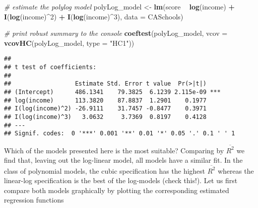 \documentclass[]{book}
\newenvironment{Shaded}{\begin{snugshade}}{\end{snugshade}}
\newcommand{\KeywordTok}[1]{\textcolor[rgb]{0.13,0.29,0.53}{\textbf{#1}}}
\newcommand{\DataTypeTok}[1]{\textcolor[rgb]{0.13,0.29,0.53}{#1}}
\newcommand{\DecValTok}[1]{\textcolor[rgb]{0.00,0.00,0.81}{#1}}
\newcommand{\StringTok}[1]{\textcolor[rgb]{0.31,0.60,0.02}{#1}}
\newcommand{\CommentTok}[1]{\textcolor[rgb]{0.56,0.35,0.01}{\textit{#1}}}
\newcommand{\OperatorTok}[1]{\textcolor[rgb]{0.81,0.36,0.00}{\textbf{#1}}}
\newcommand{\NormalTok}[1]{#1}
\theoremstyle{definition}
\theoremstyle{definition}
\theoremstyle{definition}
\theoremstyle{remark}
\begin{document}
\begin{Shaded}
\begin{Highlighting}[]
\CommentTok{# estimate the polylog model}
\NormalTok{polyLog_model <-}\StringTok{ }\KeywordTok{lm}\NormalTok{(score }\OperatorTok{~}\StringTok{ }\KeywordTok{log}\NormalTok{(income) }\OperatorTok{+}\StringTok{ }\KeywordTok{I}\NormalTok{(}\KeywordTok{log}\NormalTok{(income)}\OperatorTok{^}\DecValTok{2}\NormalTok{) }\OperatorTok{+}\StringTok{ }\KeywordTok{I}\NormalTok{(}\KeywordTok{log}\NormalTok{(income)}\OperatorTok{^}\DecValTok{3}\NormalTok{), }
                    \DataTypeTok{data =}\NormalTok{ CASchools)}

\CommentTok{# print robust summary to the console}
\KeywordTok{coeftest}\NormalTok{(polyLog_model, }
         \DataTypeTok{vcov =} \KeywordTok{vcovHC}\NormalTok{(polyLog_model, }\DataTypeTok{type =} \StringTok{"HC1"}\NormalTok{))}
\end{Highlighting}
\end{Shaded}

\begin{verbatim}
## 
## t test of coefficients:
## 
##                  Estimate Std. Error t value  Pr(>|t|)    
## (Intercept)      486.1341    79.3825  6.1239 2.115e-09 ***
## log(income)      113.3820    87.8837  1.2901    0.1977    
## I(log(income)^2) -26.9111    31.7457 -0.8477    0.3971    
## I(log(income)^3)   3.0632     3.7369  0.8197    0.4128    
## ---
## Signif. codes:  0 '***' 0.001 '**' 0.01 '*' 0.05 '.' 0.1 ' ' 1
\end{verbatim}

Which of the models presented here is the most suitable? Comparing by
\(\overline{R^2}\) we find that, leaving out the log-linear model, all
models have a similar fit. In the class of polynomial models, the cubic
specification has the highest \(\overline{R^2}\) whereas the linear-log
specification is the best of the log-models (check this!). Let us first
compare both models graphically by plotting the corresponding estimated
regression functions
\end{document}
